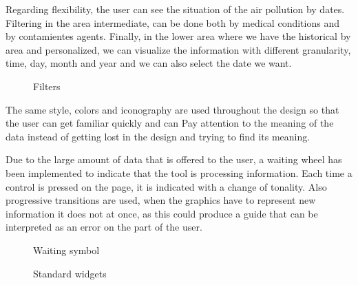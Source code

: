 Regarding flexibility, the user can see the situation of the air pollution by dates. Filtering in the area
intermediate, can be done both by medical conditions and by contamientes agents. Finally, in the lower area where we have
the historical by area and personalized, we can visualize the information with different granularity, time, day, month and year and we can also
select the date we want.

\begin{figure}[ht]
    \centering
    \hfill
    \vfill
  
  \caption{Filters}
    \end{figure}
    The same style, colors and iconography are used throughout the design so that the user can get familiar quickly and can
    Pay attention to the meaning of the data instead of getting lost in the design and trying to find its meaning.
    
    Due to the large amount of data that is offered to the user, a waiting wheel has been implemented to indicate
    that the tool is processing information. Each time a control is pressed on the page, it is indicated with a change
    of tonality. Also progressive transitions are used, when the graphics have to represent new information it does not
    at once, as this could produce a guide that can be interpreted as an error on the part of the user.
    
    \begin{figure}[ht]
        \centering
    
        \caption{Waiting symbol}
    \end{figure}
    
    \begin{figure}[ht]
        \centering
        \hfill
        \vfill
         \hfill
      
      \caption{Standard widgets}
        \end{figure}


